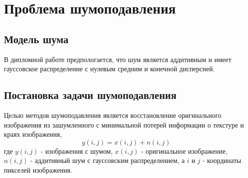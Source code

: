 \section{Проблема шумоподавления}
\subsection{Модель шума}
В дипломной работе предпологается, что шум является аддитивным и имеет гауссовское распределение с нулевым средним и конечной дисперсией.
\subsection{Постановка задачи шумоподавления}
Целью методов шумоподавления является восстановление оригинального изображения из зашумленного с минимальной потерей информации о текстуре и краях изображения,
\begin{equation}
	y(i,j) = x(i,j) + n(i,j)
\end{equation}
где $y(i,j)$ - изображения с шумом, $x(i,j)$ - оригинальное изображение, $n(i,j)$ - аддитивный шум с гауссовским распределением, а $i$ и $j$ - координаты пикселей изображения.